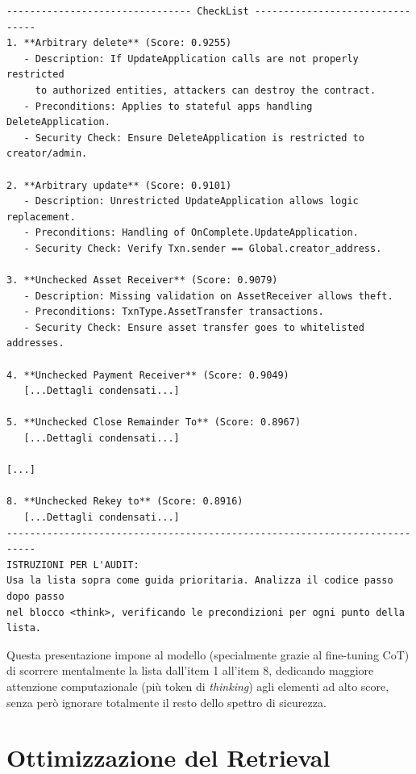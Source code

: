 \begin{lstlisting}[caption={Esempio di Checklist Dinamica iniettata nel System Prompt}, label={lst:checklist_prompt}, basicstyle=\ttfamily\footnotesize, frame=single]
-------------------------------- CheckList --------------------------------
1. **Arbitrary delete** (Score: 0.9255)
   - Description: If UpdateApplication calls are not properly restricted 
     to authorized entities, attackers can destroy the contract.
   - Preconditions: Applies to stateful apps handling DeleteApplication.
   - Security Check: Ensure DeleteApplication is restricted to creator/admin.

2. **Arbitrary update** (Score: 0.9101)
   - Description: Unrestricted UpdateApplication allows logic replacement.
   - Preconditions: Handling of OnComplete.UpdateApplication.
   - Security Check: Verify Txn.sender == Global.creator_address.

3. **Unchecked Asset Receiver** (Score: 0.9079)
   - Description: Missing validation on AssetReceiver allows theft.
   - Preconditions: TxnType.AssetTransfer transactions.
   - Security Check: Ensure asset transfer goes to whitelisted addresses.

4. **Unchecked Payment Receiver** (Score: 0.9049)
   [...Dettagli condensati...]

5. **Unchecked Close Remainder To** (Score: 0.8967)
   [...Dettagli condensati...]

[...]

8. **Unchecked Rekey to** (Score: 0.8916)
   [...Dettagli condensati...]
---------------------------------------------------------------------------
ISTRUZIONI PER L'AUDIT:
Usa la lista sopra come guida prioritaria. Analizza il codice passo dopo passo
nel blocco <think>, verificando le precondizioni per ogni punto della lista.
\end{lstlisting}

Questa presentazione impone al modello (specialmente grazie al fine-tuning CoT) di scorrere mentalmente la lista dall'item 1 all'item 8, dedicando maggiore attenzione computazionale (più token di \textit{thinking}) agli elementi ad alto score, senza però ignorare totalmente il resto dello spettro di sicurezza.

\section{Ottimizzazione del Retrieval}
\label{sec:retrieval_optimization}

